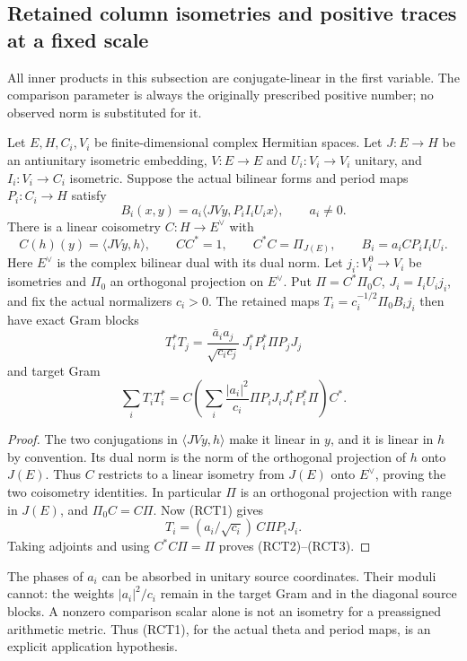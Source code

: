\subsection{Retained column isometries and positive traces at a fixed scale}
\label{sec:retained-column-positive-traces}

All inner products in this subsection are conjugate-linear in the
first variable. The comparison parameter is always the originally
prescribed positive number; no observed norm is substituted for it.

\begin{lemma}
\label{lem:retained-column-isometry}
Let \(E,H,C_i,V_i\) be finite-dimensional complex Hermitian spaces.
Let \(J:E\to H\) be an antiunitary isometric embedding, \(V:E\to E\)
and \(U_i:V_i\to V_i\) unitary, and \(I_i:V_i\to C_i\) isometric.
Suppose the actual bilinear forms and period maps \(P_i:C_i\to H\)
satisfy
\[
 B_i(x,y)=a_i\langle JVy,P_iI_iU_ix\rangle,\qquad a_i\ne0.
 \tag{RCT1}
\]
There is a linear coisometry \(C:H\to E^\vee\) with
\[
 C(h)(y)=\langle JVy,h\rangle,\qquad
 CC^*=1,\qquad C^*C=\Pi_{J(E)},\qquad
 B_i=a_iCP_iI_iU_i.
\]
Here \(E^\vee\) is the complex bilinear dual with its dual norm.
Let \(j_i:V_i^0\to V_i\) be isometries and \(\Pi_0\) an
orthogonal projection on \(E^\vee\). Put
\(\Pi=C^*\Pi_0C\), \(J_i=I_iU_ij_i\), and fix the actual
normalizers \(c_i>0\). The retained maps
\(T_i=c_i^{-1/2}\Pi_0B_ij_i\) then have exact Gram blocks
\[
 T_i^*T_j=
 \frac{\bar a_i a_j}{\sqrt{c_ic_j}}\,
                 J_i^*P_i^*\Pi P_jJ_j
 \tag{RCT2}
\]
and target Gram
\[
 \sum_iT_iT_i^*
 =C\left(\sum_i\frac{|a_i|^2}{c_i}
                    \Pi P_iJ_iJ_i^*P_i^*\Pi\right)C^*.
 \tag{RCT3}
\]
\end{lemma}
\begin{proof}
The two conjugations in \(\langle JVy,h\rangle\) make it
linear in \(y\), and it is linear in \(h\) by convention.
Its dual norm is the norm of the orthogonal projection of
\(h\) onto \(J(E)\). Thus \(C\) restricts to a linear
isometry from \(J(E)\) onto \(E^\vee\), proving the two
coisometry identities. In particular \(\Pi\) is an orthogonal
projection with range in \(J(E)\), and
\(\Pi_0C=C\Pi\). Now (RCT1) gives
\[
 T_i=(a_i/\sqrt{c_i})\,C\Pi P_iJ_i.
\]
Taking adjoints and using \(C^*C\Pi=\Pi\) proves
(RCT2)--(RCT3).
\end{proof}

The phases of \(a_i\) can be absorbed in unitary source
coordinates. Their moduli cannot: the weights \(|a_i|^2/c_i\)
remain in the target Gram and in the diagonal source blocks.
A nonzero comparison scalar alone is not an isometry for a
preassigned arithmetic metric. Thus (RCT1), for the actual
theta and period maps, is an explicit application hypothesis.

